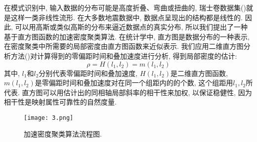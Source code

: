 在模式识别中, 输入数据的分布可能是高度折叠、弯曲或扭曲的, 瑞士卷数据集(\cite{Tenenbaum2000})就是这样一类非线性流形. 在大多数地震数据中, 数据点呈现出的结构都是线性的. 因此, 可以用高斯或类似高斯的分布来逼近数据点的真实分布, 所以我们提出了一种基于直方图函数的加速密度聚类算法. 在统计学中, 直方图是数据分布的一种表示, 在密度聚类中所需要的局部密度由直方图函数来近似表示. 我们应用二维直方图分析方法(\cite{Gonzalez2002,Zhang2015})对计算得到的零偏距时间和叠加速度进行分析, 得到局部密度的估计: 
\begin{equation}
    \rho=H(l_1,l_2)=m(l_1,l_2)
\end{equation}
其中, $l_1$和$l_2$分别代表零偏距时间和叠加速度, $H(l_1,l_2)$是二维直方图函数, $m(l_1,l_2)$是零偏距时间和叠加速度对在同一个组距内的的个数, 这个组距用$l_1,l_2$所代表. 直方图可以用估计出的同相轴局部斜率的相干性来加权, 以保证稳健性, 因为相干性是映射属性可靠性的自然度量. 
\begin{figure}[htb]
    \centering
    \texttt{[image: 3.png]}
    \caption{加速密度聚类算法流程图. \label{fig:3}}
\end{figure}

